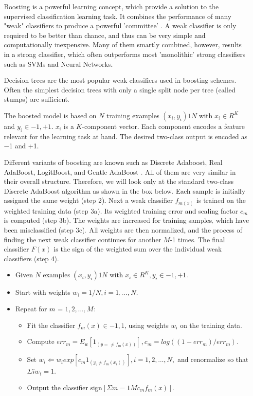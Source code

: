 Boosting is a powerful learning concept, which provide a solution to the supervised classification learning task. It combines the performance of many "weak" classifiers to produce a powerful 'committee' . A weak classifier is only required to be better than chance, and thus can be very simple and computationally inexpensive. Many of them smartly combined, however, results in a strong classifier, which often outperforms most 'monolithic' strong classifiers such as SVMs and Neural Networks.

Decision trees are the most popular weak classifiers used in boosting schemes. Often the simplest decision trees with only a single split node per tree (called stumps) are sufficient.

The boosted model is based on $N$ training examples ${(x_i,y_i)}1N$ with $x_i \in{R^K}$ and $y_i \in{-1, +1}$. $x_i$ is a $K$-component vector. Each component encodes a feature relevant for the learning task at hand. The desired two-class output is encoded as −1 and +1.

Different variants of boosting are known such as Discrete Adaboost, Real AdaBoost, LogitBoost, and Gentle AdaBoost . All of them are very similar in their overall structure. Therefore, we will look only at the standard two-class Discrete AdaBoost algorithm as shown in the box below. Each sample is initially assigned the same weight (step 2). Next a weak classifier $f_{m(x)}$ is trained on the weighted training data (step 3a). Its weighted training error and scaling factor $c_m$ is computed (step 3b). The weights are increased for training samples, which have been misclassified (step 3c). All weights are then normalized, and the process of finding the next weak classifier continues for another $M$-1 times. The final classifier $F(x)$ is the sign of the weighted sum over the individual weak classifiers (step 4).

\begin{itemize}
\item Given $N$ examples ${(x_i,y_i)}1N$ with $x_i \in{R^K}, y_i \in{-1, +1}$.
\item Start with weights $w_i = 1/N, i = 1,...,N$.
\item Repeat for $m$ = $1,2,...,M$:
\begin{itemize}
\item Fit the classifier $f_m(x) \in{-1,1}$, using weights $w_i$ on the training data.
\item Compute $err_m = E_w [1_{(y =\neq f_m(x))}], c_m = log((1 - err_m)/err_m)$.
\item Set $w_i \Leftarrow w_i exp[c_m 1_{(y_i \neq f_m(x_i))}], i = 1,2,…,N,$ and renormalize so that $\Sigma i w_i = 1$.
\item Output the classifier sign$[\Sigma m = 1M c_m f_m(x)]$.
\end{itemize}
\end{itemize}

